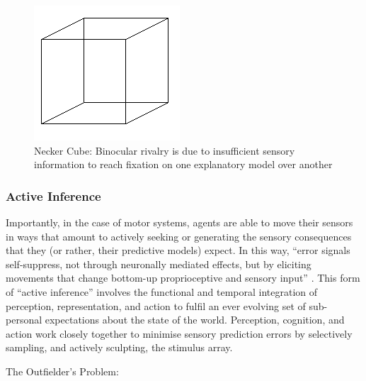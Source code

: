 \begin{CJK}{UTF8}{gbsn}
\begin{figure}[htbp]
  \begin{center}
    \includegraphics[scale=.7]{images/Necker_cube.png}
      \caption{Necker Cube: Binocular rivalry is due to insufficient sensory information to reach fixation on one explanatory model over another}
        \label{fig:neckerCube}
   \end{center}
\end{figure}


\subsubsection{Active Inference}

Importantly, in the case of motor systems, agents are able to move their sensors in ways that amount to actively seeking or generating the sensory consequences that they (or rather, their predictive models) expect.  In this way, ``error signals self-suppress, not through neuronally mediated effects, but by eliciting movements that change bottom-up proprioceptive and sensory input''  \citep[][1349]{Friston2003}.  This form of ``active inference'' involves the functional and temporal integration of perception, representation, and action to fulfil an ever evolving set of sub-personal expectations about the state of the world.  Perception, cognition, and action work closely together to minimise sensory prediction errors by selectively sampling, and actively sculpting, the stimulus array.


The Outfielder's Problem:



\end{CJK}
